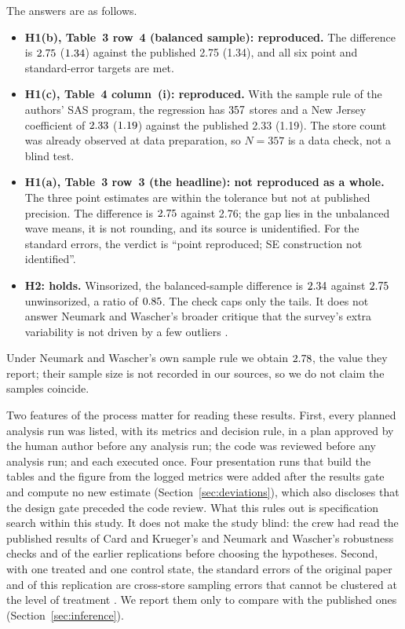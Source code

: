 \documentclass[11pt]{article}
\begin{document}
The answers are as follows.
\begin{itemize}
  \item \textbf{H1(b), Table~3 row~4 (balanced sample): reproduced.} The difference is
        $2.75$ ($1.34$) against the published 2.75 (1.34), and all
        six point and standard-error targets are met.
  \item \textbf{H1(c), Table~4 column~(i): reproduced.} With the sample rule of the
        authors' SAS program, the regression has $357$ stores and a New Jersey
        coefficient of $2.33$ ($1.19$) against the published 2.33 (1.19). The store
        count was already observed at data preparation, so $N = 357$ is a data check, not a
        blind test.
  \item \textbf{H1(a), Table~3 row~3 (the headline): not reproduced as a whole.} The three
        point estimates are within the tolerance but not at published precision. The
        difference is $2.75$ against 2.76; the gap lies in the unbalanced wave means, it
        is not rounding, and its source is unidentified. For the standard errors, the
        verdict is ``point reproduced; SE construction not identified''.
  \item \textbf{H2: holds.} Winsorized, the balanced-sample difference is
        $2.34$ against $2.75$ unwinsorized, a ratio of
        $0.85$. The check caps only the tails. It does not answer Neumark and
        Wascher's broader critique that the survey's extra variability is not driven by a
        few outliers \citep{neumark1995payroll}.
\end{itemize}
Under Neumark and Wascher's own sample rule we obtain $2.78$, the value they report;
their sample size is not recorded in our sources, so we do not claim the samples coincide.

Two features of the process matter for reading these results. First, every planned analysis run was
listed, with its metrics and decision rule, in a plan approved by the human author before
any analysis run; the code was reviewed before any analysis run; and each executed once.
Four presentation runs that build the tables and the figure from the logged metrics were
added after the results gate and compute no new estimate
(Section~\ref{sec:deviations}), which also discloses that the design gate preceded the code
review. What
this rules out is specification search within this study. It does not make the study
blind: the crew had read the published results of Card and Krueger's and Neumark and
Wascher's robustness checks and of the earlier replications before choosing the
hypotheses. Second, with one treated and one control state, the standard errors of the
original paper and of this replication are cross-store sampling errors that cannot be
clustered at the level of treatment \citep{conley2011inference}. We report them only to
compare with the published ones (Section~\ref{sec:inference}).
\end{document}
